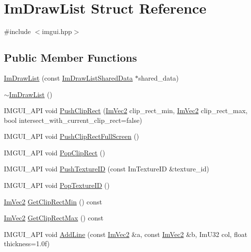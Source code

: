 \hypertarget{struct_im_draw_list}{}\section{Im\+Draw\+List Struct Reference}
\label{struct_im_draw_list}


{\ttfamily \#include $<$imgui.\+hpp$>$}

\subsection*{Public Member Functions}
\begin{DoxyCompactItemize}
\item 
\hyperlink{struct_im_draw_list_a7c2af665f2c3e3bb5fc8aa34ef6dac91}{Im\+Draw\+List} (const \hyperlink{struct_im_draw_list_shared_data}{Im\+Draw\+List\+Shared\+Data} $\ast$shared\+\_\+data)
\item 
\hyperlink{struct_im_draw_list_a19fd8d920c202cf8ba5f5c55c43d1d2a}{$\sim$\+Im\+Draw\+List} ()
\item 
I\+M\+G\+U\+I\+\_\+\+A\+PI void \hyperlink{struct_im_draw_list_acb34e2d3708616cae4567f3b4af06962}{Push\+Clip\+Rect} (\hyperlink{struct_im_vec2}{Im\+Vec2} clip\+\_\+rect\+\_\+min, \hyperlink{struct_im_vec2}{Im\+Vec2} clip\+\_\+rect\+\_\+max, bool intersect\+\_\+with\+\_\+current\+\_\+clip\+\_\+rect=false)
\item 
I\+M\+G\+U\+I\+\_\+\+A\+PI void \hyperlink{struct_im_draw_list_a0ab1ab409f0e269755e50a77901bae39}{Push\+Clip\+Rect\+Full\+Screen} ()
\item 
I\+M\+G\+U\+I\+\_\+\+A\+PI void \hyperlink{struct_im_draw_list_a44f40c59ca755f559020f5a7fa81103a}{Pop\+Clip\+Rect} ()
\item 
I\+M\+G\+U\+I\+\_\+\+A\+PI void \hyperlink{struct_im_draw_list_ac0dc0ecf692ab4c6ce58dd5381efb20d}{Push\+Texture\+ID} (const Im\+Texture\+ID \&texture\+\_\+id)
\item 
I\+M\+G\+U\+I\+\_\+\+A\+PI void \hyperlink{struct_im_draw_list_ade9286c5ca58753f7bd571b30e2ff76c}{Pop\+Texture\+ID} ()
\item 
\hyperlink{struct_im_vec2}{Im\+Vec2} \hyperlink{struct_im_draw_list_a9d83896d3eb434a9e1072d56523a2754}{Get\+Clip\+Rect\+Min} () const
\item 
\hyperlink{struct_im_vec2}{Im\+Vec2} \hyperlink{struct_im_draw_list_a8e484a61eab501c1c1c416a8b45bb08e}{Get\+Clip\+Rect\+Max} () const
\item 
I\+M\+G\+U\+I\+\_\+\+A\+PI void \hyperlink{struct_im_draw_list_a6db76ca2506dc86ad4d602fdcd2e2ea8}{Add\+Line} (const \hyperlink{struct_im_vec2}{Im\+Vec2} \&a, const \hyperlink{struct_im_vec2}{Im\+Vec2} \&b, Im\+U32 col, float thickness=1.\+0f)

\end{DoxyCompactItemize}
